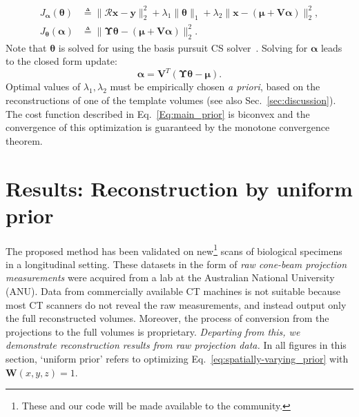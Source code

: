 \documentclass[journal]{IEEEtran}
\begin{document}
\begin{align}
J_{\boldsymbol{\alpha}}(\boldsymbol{\theta}) &\triangleq \lVert\boldsymbol{\mathcal{R} x- y}\rVert_2^2  + \lambda_1\lVert\boldsymbol{\theta}\rVert_1+\lambda_2\lVert\boldsymbol{x} - (\boldsymbol{\mu + V\alpha})\rVert_2^2, \\
J_{\boldsymbol\theta}(\boldsymbol{\alpha}) &\triangleq \lVert\boldsymbol{\Upsilon\theta} - (\boldsymbol{\mu + V\alpha})\rVert_2^2.
\end{align}
Note that $\boldsymbol{\theta}$ is solved for using the basis pursuit CS solver~\cite{l1ls}. Solving for $\boldsymbol{\alpha}$ leads to the closed form update:
\begin{equation}
\boldsymbol{\boldsymbol{\alpha}} = \boldsymbol{V}^T(\boldsymbol{\Upsilon \theta} -\boldsymbol{\mu}).
\end{equation}
 Optimal values of $\lambda_1, \lambda_2$ must be empirically chosen \textit{a priori}, based on the reconstructions of one of the template volumes (see also Sec.~\ref{sec:discussion}). The cost function described in Eq.~\ref{Eq:main_prior} is biconvex and the convergence of this optimization is guaranteed by the monotone convergence theorem.
 \vspace{2mm}

 \section{Results: Reconstruction by uniform prior}
 \label{sec:results_uniform_prior}

 
 The proposed method has been validated on new\footnote {These and our
   code will be made available to the community.} scans of biological
 specimens in a longitudinal setting. These datasets in the form of
 \emph{raw cone-beam projection measurements} were acquired from a lab
 at the Australian National University (ANU). Data from commercially
 available CT machines is not suitable because most CT scanners do
 not reveal the raw measurements, and instead output only the full
 reconstructed volumes. Moreover, the process of conversion from the
 projections to the full volumes is proprietary.
 \emph{Departing from this, we
   demonstrate reconstruction results from raw projection data.}
In all figures in this section, `uniform prior' refers to optimizing Eq.~\ref{eq:spatially-varying_prior} with $\boldsymbol{W}(x,y,z)=1$.
\end{document}
